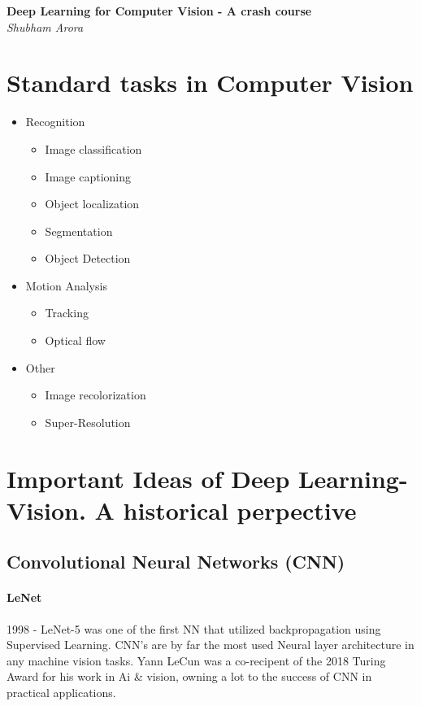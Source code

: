 \documentclass{article}
\begin{document}
	\begin{titlepage}
		\begin{center}
			\Large\textbf{Deep Learning for Computer Vision - A crash course}\\
			\large\textit{Shubham Arora}
		\end{center}
	\end{titlepage}
	
	
	\section{Standard tasks in Computer Vision}
	\begin{itemize}
		\item Recognition
		\begin{itemize}
			\item Image classification
			\item Image captioning
			\item Object localization
			\item Segmentation
			\item Object Detection
		\end{itemize}
		\item Motion Analysis
		\begin{itemize}
			\item Tracking
			\item Optical flow
		\end{itemize}
		\item Other
		\begin{itemize}
			\item Image recolorization
			\item Super-Resolution
		\end{itemize}
	
	\end{itemize}
	\section{Important Ideas of Deep Learning-Vision. A historical perpective}
	
	\subsection{Convolutional Neural Networks (CNN)}
		\paragraph{LeNet}
			1998 - LeNet-5 was one of the first NN that utilized backpropagation using Supervised Learning. CNN's are by far the most used Neural layer architecture in any machine vision tasks. Yann LeCun was a co-recipent of the 2018 Turing Award for his work in Ai \& vision, owning a lot to the success of CNN in practical applications.
			
\end{document}

